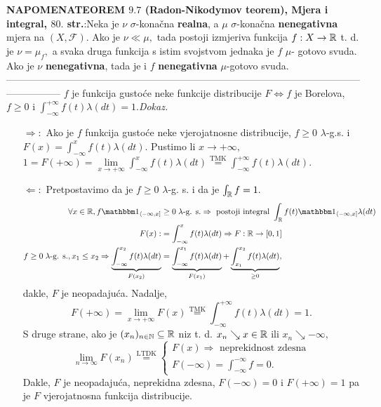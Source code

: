 \documentclass{article}
\begin{document}
\textbf{NAPOMENA}\newline \textbf{TEOREM \(9.7\) (Radon-Nikodymov teorem), Mjera i integral, \(80.\) str.}:\newline Neka je \(\nu\) \(\sigma\)-konačna \textbf{realna}, a \(\mu\) \(\sigma\)-konačna \textbf{nenegativna} mjera na \((X,\mathcal F).\) Ako je \(\nu\ll\mu,\) tada postoji izmjeriva funkcija \(f:X\to\Bbb R\) t. d. je \(\nu=\mu_f,\) a svaka druga funkcija s istim svojstvom jednaka je \(f\) \(\mu\)- gotovo svuda. Ako je \(\nu\) \textbf{nenegativna}, tada je i \(f\) \textbf{nenegativna} \(\mu\)-gotovo svuda.\newline\newline
-----------------------------------------------------------------------------------------------------------------------------\newline\newline
\(f\) je funkcija gustoće neke funkcije distribucije \(F\Leftrightarrow f\) je Borelova, \(f\ge 0\) i \(\int_{-\infty}^{+\infty}f(t)\lambda(dt)=1.\)\newline\newline\textit{Dokaz.}
\begin{itemize}
    \item[\(\boxed{\Rightarrow}:\)] Ako je \(f\) funkcija gustoće neke vjerojatnosne distribucije, \(f\ge 0\) \(\lambda\)-g.s. i \(F(x)=\int_{-\infty}^xf(t)\lambda(dt).\) Pustimo li \(x\to+\infty,\) \(1=F(+\infty)=\lim\limits_{x\to+\infty}\int_{-\infty}^xf(t)\lambda(dt)\overset{\text{TMK}}{=}\int_{-\infty}^{+\infty}f(t)\lambda(dt).\)
    \item[\(\boxed{\Leftarrow}:\)] Pretpostavimo da je \(f\ge0\) \(\lambda\)-g. s. i da je \(\int_\Bbb R f=1.\) \[\begin{aligned}\forall x\in\Bbb R, f\mathbbm 1_{\langle -\infty,x]}&\ge0\;\lambda\text{-g. s.}\Rightarrow\text{ postoji integral }\int_\Bbb R f(t)\mathbbm 1_{\langle-\infty,x]}\lambda(dt)\\F(x):&=\int_{-\infty}^xf(t)\lambda(dt)\Rightarrow F:\Bbb R\to[0,1]\\f\ge0\;\lambda\text{-g. s.},x_1\le x_2\Rightarrow\underbrace{\int_{-\infty}^{x_2}f(t)\lambda(dt)}_{F(x_2)}&=\underbrace{\int_{-\infty}^{x_1}f(t)\lambda(dt)}_{F(x_1)}+\underbrace{\int_{x_1}^{x_2}f(t)\lambda(dt)}_{\ge0},\end{aligned}\] dakle, \(F\) je neopadajuća. Nadalje, \[F(+\infty)=\lim_{x\to+\infty}F(x)\overset{\text{TMK}}{=}\int_{-\infty}^{+\infty}f(t)\lambda(dt)=1.\] S druge strane, ako je \((x_n)_{n\in\Bbb N}\subseteq\Bbb R\) niz t. d. \(x_n\searrow x\in\Bbb R\) ili \(x_n\searrow-\infty,\) \[\lim_{n\to\infty}F(x_n)\overset{\text{LTDK}}{=}\begin{cases}F(x)\Rightarrow\text{ neprekidnost zdesna}\\F(-\infty)=\int_{-\infty}^{-\infty}f=0.\end{cases}\] Dakle, \(F\) je neopadajuća, neprekidna zdesna, \(F(-\infty)=0\) i \(F(+\infty)=1\) pa je \(F\) vjerojatnosna funkcija distribucije. 
\end{itemize}
\end{document}
